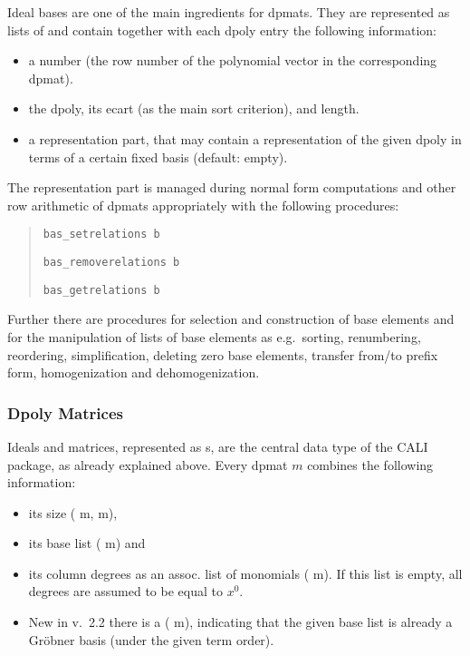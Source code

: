 Ideal bases are one of the main ingredients for dpmats. They are
represented as lists of  and contain together with
each dpoly entry the following information:
\begin{itemize}
\item a number (the row number of the polynomial vector in the
corresponding dpmat).

\item the dpoly, its ecart (as the main sort criterion), and length. 

\item a representation part, that may contain a representation of the
given dpoly in terms of a certain fixed basis (default: empty).
\end{itemize}

The representation part is managed during normal form computations
and other row arithmetic of dpmats appropriately with the following
procedures: 
\begin{quote}
\verb|bas_setrelations b| 


\verb|bas_removerelations b| 


\verb|bas_getrelations b| 

\end{quote}

Further there are procedures for selection and construction of base
elements and for the manipulation of lists of base elements as e.g.\
sorting, renumbering, reordering, simplification, deleting zero base
elements, transfer from/to prefix form, homogenization and dehomogenization. 

\subsubsection{Dpoly Matrices}

Ideals and matrices, represented as s, are the central
data type of the CALI package, as already explained above. Every
dpmat $m$ combines the following information:
\begin{itemize}
\item its size ( m, m),

\item its base list ( m) and

\item its column degrees as an assoc. list of monomials
( m). If this list is empty, all degrees are
assumed to be equal to $x^0$.

\item New in v.\ 2.2 there is a  ( m),
indicating that the given base list is already a Gr\"obner basis (under the
given term order). 
\end{itemize}

